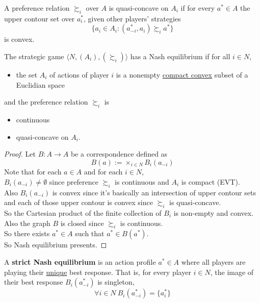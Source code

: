 \documentclass[11pt]{article}
\begin{document}
		\begin{definition}[pg.20]
			A preference relation $\succsim_i$ over $A$ is quasi-concave on $A_i$ if for every $a^* \in A$ the upper contour set over $a^*_i$, given other players' strategies
			\[
				\{a_i \in A_i: (a^*_{-i}, a_i) \succsim_i a^*\}
			\]
			is convex.
		\end{definition}
		
		\begin{proposition}[20.3]
			The strategic game $\langle N, (A_i), (\succsim_i) \rangle$ has a Nash equilibrium if for all $i \in N$,
			\begin{itemize}
				\item the set $A_i$ of actions of player $i$ is a nonempty \ul{compact convex} subset of a Euclidian space
			\end{itemize}
			and the preference relation $\succsim_i$ is
			\begin{itemize}
				\item continuous
				\item quasi-concave on $A_i$.
			\end{itemize}
		\end{proposition}
		
		\begin{proof}
			Let $B: A \to A$ be a correspondence defined as 
			\[
				B(a) := \times_{i \in N} B_i(a_{-i})
			\]
			Note that for each $a \in A$ and for each $i \in N$, \\
			$B_i(a_{-i}) \neq \emptyset$ since preference $\succsim_i$ is continuous and $A_i$ is compact (EVT). \\
			Also $B_i(a_{-i})$ is convex since it's basically an intersection of  upper contour sets and each of those upper contour is convex since $\succsim_i$ is quasi-concave. \\
			So the Cartesian product of the finite collection of $B_i$ is non-empty and convex. \\
			Also the graph $B$ is closed since $\succsim_i$ is continuous. \\
			So there exists $a^* \in A$ such that $a^* \in B(a^*)$. \\
			So Nash equilibrium presents.
		\end{proof}
		
		\begin{definition}[lec.3]
			A \textbf{strict Nash equilibrium} is an action profile $a^* \in A$ where all players are playing their \ul{unique} best response. That is, for every player $i \in N$, the image of their best response $B_i(a_{-i}^*)$ is singleton,
			\[
				\forall i \in N\ B_i(a_{-i}^*) = \{a_i^*\}
			\]
		\end{definition}
		
\end{document}
